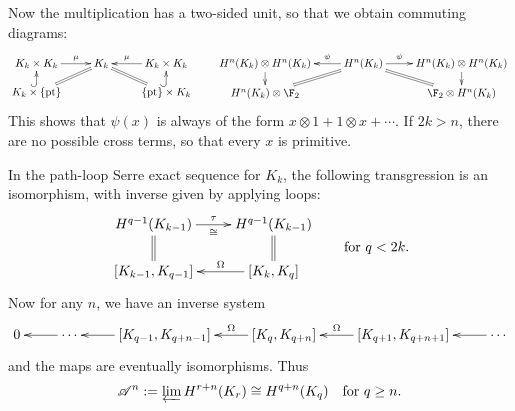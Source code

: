 \documentclass[11pt]{article}
\begin{document}
\noindent Now the multiplication has a two-sided unit, so that we obtain commuting diagrams:
\[\xymatrix@R=.4cm{
K_k\times K_k
\ar[r]^-{\mu}
&%
K_k
\ar@{=}[rd]
\ar@{=}[ld]
&%
K_k\times K_k
\ar[l]_-{\mu}
\\%
K_k\times\{\textup{pt}\}\ar@{^{(}->}[u]
&%
&%
\{\textup{pt}\}\times K_k\ar@{^{(}->}[u]
}\qquad 
\xymatrix@R=.4cm{
H^n(K_k)\otimes H^n(K_k)
\ar[r];[]_-{\psi}
&%
H^n(K_k)
\ar@{=}[dr];[]\ar@{=}[dl];[]
&%
H^n(K_k)\otimes H^n(K_k)
\ar[l];[]^-{\psi}
\\%
H^n(K_k)\otimes\F_2\ar[u];[]
&%
&%
\F_2\otimes H^n(K_k)\ar[u];[]
}\]
This shows that $\psi(x)$ is always of the form $x\otimes 1+1\otimes x+\cdots$. If $2k>n$, there are no possible cross terms, so that every $x$ is primitive.

In the path-loop Serre exact sequence for $K_k$, the following transgression is an isomorphism, with inverse given by applying loops:
\[\vcenter{\xymatrix@R=6mm{
{H}^{q-1}(K_{k-1})
\ar[r]_-{\cong}^-{\tau}
\ar@{=}[d]
&%
{H}^{q-1}(K_{k-1})
\ar@{=}[d]
\\%
[K_{k-1},K_{q-1}]
&%
[K_{k},K_{q}]
\ar[l]_-{\Omega}
}}\textup{\qquad for $q<2k$}.\]
Now for any $n$, we have an inverse system
\[\xymatrix{
0&
\ar[l]\cdots&
[K_{q-1},K_{q+n-1}]\ar[l]&
[K_q,K_{q+n}]\ar[l]_-\Omega&
[K_{q+1},K_{q+n+1}]\ar[l]_-\Omega&
\cdots\ar[l]}\]
and the maps are eventually isomorphisms. Thus
\[\mathscr{A}^n:=\varprojlim H^{r+n}(K_r)\cong H^{q+n}(K_q)\textup{\quad for $q\geq n$.}\]
\end{document}
